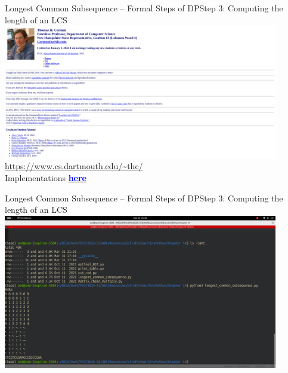\documentclass[aspectratio=169]{beamer}
\begin{document}
\begin{frame}{Longest Common Subsequence -- Formal Steps of DP}{Step 3: Computing the length of an LCS}
    \centering
    \includegraphics[width=0.9\textwidth]{figures/thc}
    \url{https://www.cs.dartmouth.edu/~thc/} \\
    Implementations \href{https://mitp-content-server.mit.edu/books/content/sectbyfn/books_pres_0/11599/clrsPython.zip}{\textcolor{blue}{\textbf{here}}}
\end{frame}

\begin{frame}{Longest Common Subsequence -- Formal Steps of DP}{Step 3: Computing the length of an LCS}
    \centering
    \includegraphics[width=0.9\textwidth]{figures/output}
\end{frame}
\end{document}
